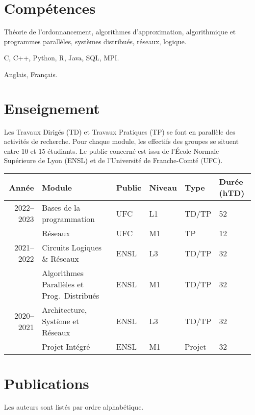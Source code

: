 \documentclass[12pt]{article}
\newcounter{cvitems}
\newcommand{\cvitem}[2]{\item[#1] #2}
\begin{document}
\section*{Compétences}

\begin{cvitems}
  \cvitem{Académiques}{Théorie de l'ordonnancement, algorithmes d'approximation, algorithmique et programmes parallèles, systèmes distribués, réseaux, logique.}

  \cvitem{Techniques}{C, C++, Python, R, Java, SQL, MPI.}

  \cvitem{Linguistiques}{Anglais, Français.}
\end{cvitems}

\section*{Enseignement}

Les Travaux Dirigés (TD) et Travaux Pratiques (TP) se font en parallèle des activités de recherche.  
Pour chaque module, les effectifs des groupes se situent entre 10 et 15 étudiants.  
Le public concerné est issu de l'École Normale Supérieure de Lyon (ENSL) et de l'Université de
Franche-Comté (UFC).

\begin{center}
  \footnotesize
  \begin{tabularx}{\textwidth}{rXllll}
    \toprule
    Année & Module & Public & Niveau & Type & Durée (hTD) \tabularnewline
    \midrule
    2022--2023 & Bases de la programmation & UFC & L1 & TD/TP & 52 \tabularnewline
    & Réseaux & UFC & M1 & TP & 12 \tabularnewline
    \midrule
    2021--2022 & Circuits Logiques \& Réseaux & ENSL & L3 & TD/TP & 32 \tabularnewline
    & Algorithmes Parallèles et Prog.\ Distribués & ENSL & M1 & TD/TP & 32 \tabularnewline
    \midrule
    2020--2021 & Architecture, Système et Réseaux & ENSL & L3 & TD/TP & 32 \tabularnewline
    & Projet Intégré & ENSL & M1 & Projet & 32 \tabularnewline
    \bottomrule
  \end{tabularx}
\end{center}

\section*{Publications}

Les auteurs sont listés par ordre alphabétique.

\nocite{*}

\newcommand{\showbib}[1]{%
  \begin{otherlanguage}{english}
    \printbibliography[heading=none,keyword={#1}]
  \end{otherlanguage}}
\end{document}
